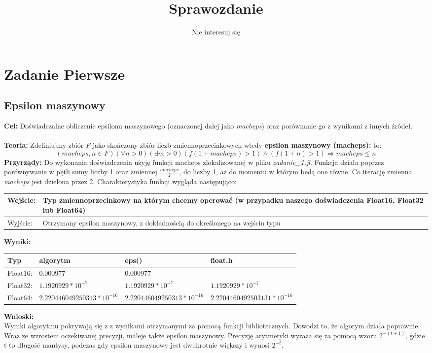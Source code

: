 \documentclass{article}
\author{Nie interesuj się}
\title{Sprawozdanie}
\begin{document}
\maketitle
\section{Zadanie Pierwsze}
\subsection{Epsilon maszynowy}
\noindent \textbf{Cel:} Doświadczalne obliczenie epsilonu maszynowego (oznaczonej dalej jako \textit{macheps}) oraz porównanie go z wynikami z innych źródeł.\\\\
\noindent \textbf{Teoria:} Zdefiniujmy zbiór \textit{F} jako skończony zbiór liczb zmiennoprzecinkowych wtedy {\textbf{epsilon maszynowy (macheps):}} to:
$$ (macheps,n \in F)(\forall n > 0)(\exists m > 0)(f(1+macheps) > 1)\land (f(1+n) > 1) \Rightarrow macheps \leq n $$
\noindent \textbf{Przyrządy:} Do wykonania doświadczenia użyję funkcji macheps zlokalizowanej w pliku \textit{zadanie\_1.jl}. Funkcja działa poprzez porównywanie w pętli sumy liczby 1 oraz zmiennej \textit{$\frac{macheps}{2}$}, do liczby 1, aż do momentu w którym bedą one równe. Co iterację zmienna \textit{macheps} jest dzielona przez 2. Charakterystyka funkcji wygląda następująco:\\
\begin{center}
  \begin{tabular}{|p{3cm}|p{8cm}|} \hline
    Wejście: & Typ zmiennoprzecinkowy na którym chcemy operować (w przypadku naszego doświadczenia Float16, Float32 lub Float64) \\
    \hline \hline
    Wyjście: & Otrzymany epsilon maszynowy, z dokładnością do określonego na wejściu typu  \\
    \hline
  \end{tabular}
\end{center}
\noindent \textbf{Wyniki:}\\
\begin{center}
  \begin{tabular}{|p{}|p{}|p{}|p{5cm}|} \hline
    \textbf{Typ} & \textbf{algorytm} & \textbf{eps()} & \textbf{float.h} \\
    \hline
    Float16: & 0.000977 & 0.000977 & - \\
    \hline
    Float32: & $1.1920929 * 10^{-7}$ & $1.1920929 * 10^{-7}$ &  $1.1920929 * 10^{-7}$ \\
    \hline
    Float64: & $2.220446049250313 * 10^{-16}$ & $2.220446049250313 * 10^{-16}$ & $2.2204460492503131 * 10^{-16}$ \\
    \hline
  \end{tabular}
\end{center}
\noindent \textbf{Wnioski:}\\ Wyniki algorytmu pokrywają się z z wynikami otrzymanymi za pomocą funkcji bibliotecznych. Dowodzi to, że algorym działa poprawnie. Wraz ze wzrostem oczekiwanej precyzji, maleje także epsilon maszynowy.
Precyzję arytmetyki wyraża się za pomocą wzoru $2^{-(t+1)}$, gdzie t to długość mantysy, podczas gdy epsilon maszynowy jest dwukrotnie większy i wynosi $2^{-t}$.
\end{document}
